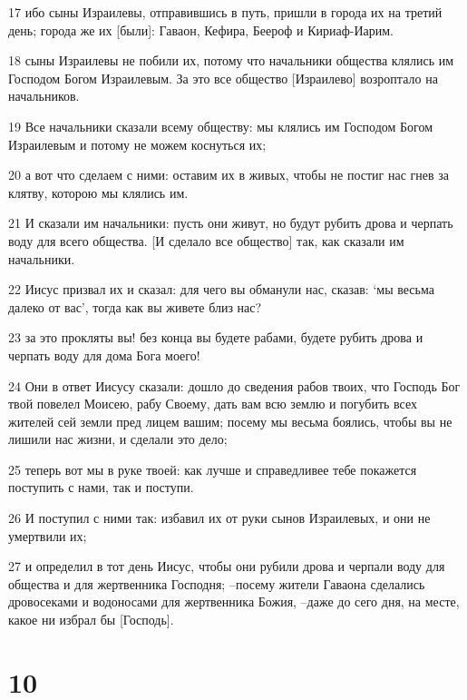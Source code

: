\par 17 ибо сыны Израилевы, отправившись в путь, пришли в города их на третий день; города же их [были]: Гаваон, Кефира, Беероф и Кириаф-Иарим.
\par 18 сыны Израилевы не побили их, потому что начальники общества клялись им Господом Богом Израилевым. За это все общество [Израилево] возроптало на начальников.
\par 19 Все начальники сказали всему обществу: мы клялись им Господом Богом Израилевым и потому не можем коснуться их;
\par 20 а вот что сделаем с ними: оставим их в живых, чтобы не постиг нас гнев за клятву, которою мы клялись им.
\par 21 И сказали им начальники: пусть они живут, но будут рубить дрова и черпать воду для всего общества. [И сделало все общество] так, как сказали им начальники.
\par 22 Иисус призвал их и сказал: для чего вы обманули нас, сказав: `мы весьма далеко от вас', тогда как вы живете близ нас?
\par 23 за это прокляты вы! без конца вы будете рабами, будете рубить дрова и черпать воду для дома Бога моего!
\par 24 Они в ответ Иисусу сказали: дошло до сведения рабов твоих, что Господь Бог твой повелел Моисею, рабу Своему, дать вам всю землю и погубить всех жителей сей земли пред лицем вашим; посему мы весьма боялись, чтобы вы не лишили нас жизни, и сделали это дело;
\par 25 теперь вот мы в руке твоей: как лучше и справедливее тебе покажется поступить с нами, так и поступи.
\par 26 И поступил с ними так: избавил их от руки сынов Израилевых, и они не умертвили их;
\par 27 и определил в тот день Иисус, чтобы они рубили дрова и черпали воду для общества и для жертвенника Господня; --посему жители Гаваона сделались дровосеками и водоносами для жертвенника Божия, --даже до сего дня, на месте, какое ни избрал бы [Господь].

\chapter{10}

